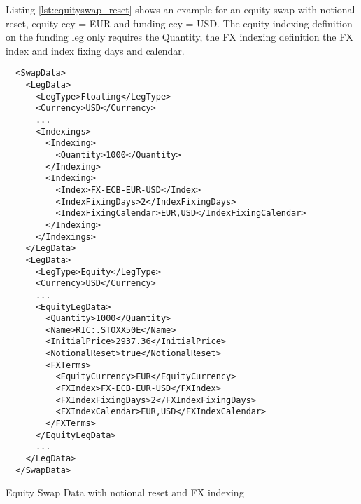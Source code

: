 Listing \ref{lst:equityswap_reset} shows an example for an equity swap with notional reset, equity ccy = EUR and funding
ccy = USD. The equity indexing definition on the funding leg only requires the Quantity, the FX indexing definition the
FX index and index fixing days and calendar.


\begin{listing}[H]
\begin{verbatim}
  <SwapData>
    <LegData>
      <LegType>Floating</LegType>
      <Currency>USD</Currency>
      ...
      <Indexings>
        <Indexing>
          <Quantity>1000</Quantity>
        </Indexing>
        <Indexing>
          <Index>FX-ECB-EUR-USD</Index>
          <IndexFixingDays>2</IndexFixingDays>
          <IndexFixingCalendar>EUR,USD</IndexFixingCalendar>
        </Indexing>
      </Indexings>
    </LegData>
    <LegData>
      <LegType>Equity</LegType>
      <Currency>USD</Currency>
      ...
      <EquityLegData>
        <Quantity>1000</Quantity>
        <Name>RIC:.STOXX50E</Name>
        <InitialPrice>2937.36</InitialPrice>
        <NotionalReset>true</NotionalReset>
        <FXTerms>
          <EquityCurrency>EUR</EquityCurrency>
          <FXIndex>FX-ECB-EUR-USD</FXIndex>
          <FXIndexFixingDays>2</FXIndexFixingDays>
          <FXIndexCalendar>EUR,USD</FXIndexCalendar>
        </FXTerms>
      </EquityLegData>
      ...
    </LegData>
  </SwapData>
\end{verbatim}
\caption{Equity Swap Data with notional reset and FX indexing}
\label{lst:equityswap_reset}
\end{listing}
